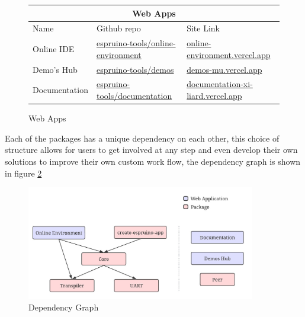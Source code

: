 \documentclass{l4proj}
\begin{document}
\begin{figure}[!ht]
\begin{center}
\begin{tabular}{|p{2.25cm}|p{5.25cm}|p{5.25cm}|}
\hline
\multicolumn{3}{|c|}{Web Apps} \\
 \hline
 Name & Github repo & Site Link\\
 \hline
Online IDE & \href{https://github.com/espruino-tools/online-environment}{espruino-tools/online-environment} & \href{https://online-environment.vercel.app/}{online-environment.vercel.app} \\
Demo's Hub & \href{https://github.com/espruino-tools/demos}{espruino-tools/demos}  & \href{https://demos-mu.vercel.app/}{demos-mu.vercel.app} \\
Documentation & \href{https://github.com/espruino-tools/documentation}{espruino-tools/documentation} & \href{https://documentation-xi-liard.vercel.app/}{documentation-xi-liard.vercel.app} \\
 \hline
\end{tabular}
\end{center}
\caption{Web Apps}
\label{fig:webapps}
\end{figure}

Each of the packages has a unique dependency on each other, this choice of structure allows for users to get involved at any step and even develop their own solutions to improve their own custom work flow, the dependency graph is shown in figure \ref{fig:package_dep_graph}


\begin{figure}[!ht]
    \centering
    \includegraphics[width=10cm]{dissertation/images/Package_dependency_graph.jpeg}
    \caption{Dependency Graph}
    \label{fig:package_dep_graph}
\end{figure}
\end{document}
